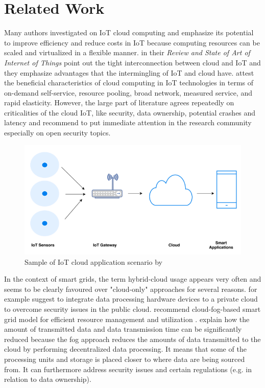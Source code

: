 \section{Related Work}

Many authors investigated on IoT cloud computing and emphasize its potential to improve efficiency and reduce costs in IoT because computing resources can be scaled and virtualized in a flexible manner. \citeauthor{laghari2021review} in their \textit{Review and State of Art of Internet of Things} point out the tight interconnection between cloud and IoT and they emphasize advantages that the intermingling of IoT and cloud have. \citeauthor{almolhis2020security} attest the beneficial characteristics of cloud computing in IoT technologies in terms of on-demand self-service, resource pooling, broad network, measured service, and rapid elasticity. However, the large part of literature agrees repeatedly on criticalities of the cloud IoT, like security, data ownership, potential crashes and latency and \citeauthor{almolhis2020security} recommend to put immediate attention in the research community especially on open security topics.

\begin{figure}[htbp]
\centerline{\includegraphics[scale=0.35]{images/iot_cloud_application_scenario.png}}
\caption{Sample of IoT cloud application scenario by \citeauthor{almolhis2020security}}
\label{fig}
\end{figure}

In the context of smart grids, the term hybrid-cloud usage appears very often and seems to be clearly favoured over "cloud-only" approaches for several reasons. \citeauthor{talaat2020hybrid} for example suggest to integrate data processing hardware devices to a private cloud to overcome security issues in the public cloud. \citeauthor{zahoor2018cloudmanag} recommend cloud-fog-based smart grid model for efficient resource management \cite{zahoor2018cloudmanag} and utilization \cite{zahoor2018cloudutil}. \citeauthor{zahoor2018cloudmanag} explain how the amount of transmitted data and data transmission time can be significantly reduced because the fog approach reduces the amounts of data transmitted to the cloud by performing decentralized data processing. It means that some of the processing units and storage is placed closer to where data are being sourced from. It can furthermore address security issues and certain regulations (e.g. in relation to data ownership).

